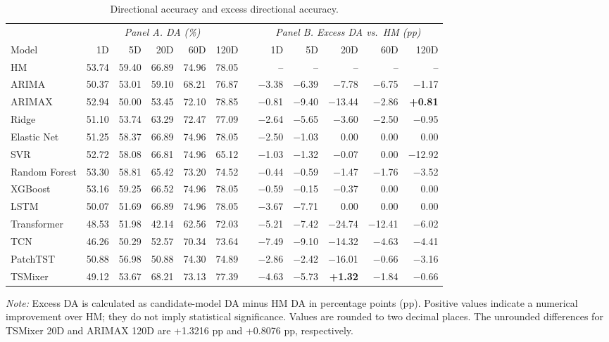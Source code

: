 \documentclass[runningheads,orivec]{llncs}
\begin{document}
\begin{table}[htbp]
\centering
\caption{Directional accuracy and excess directional accuracy.}\label{tab:da_main}
{\small
\setlength{\tabcolsep}{2.2pt}
\begin{tabular}{lrrrrr@{\hspace{4pt}}c@{\hspace{4pt}}rrrrr}
\hline
 & \multicolumn{5}{c}{\textit{Panel A. DA (\%)}} & & \multicolumn{5}{c}{\textit{Panel B. Excess DA vs.\ HM (pp)}} \\
\cline{2-6}\cline{8-12}
Model & 1D & 5D & 20D & 60D & 120D & & 1D & 5D & 20D & 60D & 120D \\
\hline
HM & 53.74 & 59.40 & 66.89 & 74.96 & 78.05 & & -- & -- & -- & -- & -- \\
ARIMA & 50.37 & 53.01 & 59.10 & 68.21 & 76.87 & & $-$3.38 & $-$6.39 & $-$7.78 & $-$6.75 & $-$1.17 \\
ARIMAX & 52.94 & 50.00 & 53.45 & 72.10 & 78.85 & & $-$0.81 & $-$9.40 & $-$13.44 & $-$2.86 & \textbf{+0.81} \\
Ridge & 51.10 & 53.74 & 63.29 & 72.47 & 77.09 & & $-$2.64 & $-$5.65 & $-$3.60 & $-$2.50 & $-$0.95 \\
Elastic Net & 51.25 & 58.37 & 66.89 & 74.96 & 78.05 & & $-$2.50 & $-$1.03 & 0.00 & 0.00 & 0.00 \\
SVR & 52.72 & 58.08 & 66.81 & 74.96 & 65.12 & & $-$1.03 & $-$1.32 & $-$0.07 & 0.00 & $-$12.92 \\
Random Forest & 53.30 & 58.81 & 65.42 & 73.20 & 74.52 & & $-$0.44 & $-$0.59 & $-$1.47 & $-$1.76 & $-$3.52 \\
XGBoost & 53.16 & 59.25 & 66.52 & 74.96 & 78.05 & & $-$0.59 & $-$0.15 & $-$0.37 & 0.00 & 0.00 \\
LSTM & 50.07 & 51.69 & 66.89 & 74.96 & 78.05 & & $-$3.67 & $-$7.71 & 0.00 & 0.00 & 0.00 \\
Transformer & 48.53 & 51.98 & 42.14 & 62.56 & 72.03 & & $-$5.21 & $-$7.42 & $-$24.74 & $-$12.41 & $-$6.02 \\
TCN & 46.26 & 50.29 & 52.57 & 70.34 & 73.64 & & $-$7.49 & $-$9.10 & $-$14.32 & $-$4.63 & $-$4.41 \\
PatchTST & 50.88 & 56.98 & 50.88 & 74.30 & 74.89 & & $-$2.86 & $-$2.42 & $-$16.01 & $-$0.66 & $-$3.16 \\
TSMixer & 49.12 & 53.67 & 68.21 & 73.13 & 77.39 & & $-$4.63 & $-$5.73 & \textbf{+1.32} & $-$1.84 & $-$0.66 \\
\hline
\end{tabular}}
\par\vspace{4pt}\parbox{\linewidth}{\footnotesize\textit{Note:} Excess DA is calculated as candidate-model DA minus HM DA in percentage points (pp). Positive values indicate a numerical improvement over HM; they do not imply statistical significance. Values are rounded to two decimal places. The unrounded differences for TSMixer 20D and ARIMAX 120D are +1.3216 pp and +0.8076 pp, respectively.}
\end{table}
\end{document}
